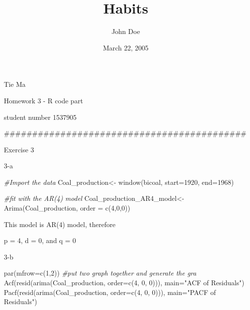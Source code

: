 \documentclass[
]{article}
\title{Habits}
\author{John Doe}
\date{March 22, 2005}
\newenvironment{Shaded}{\begin{snugshade}}{\end{snugshade}}
\newcommand{\AttributeTok}[1]{\textcolor[rgb]{0.77,0.63,0.00}{#1}}
\newcommand{\CommentTok}[1]{\textcolor[rgb]{0.56,0.35,0.01}{\textit{#1}}}
\newcommand{\DecValTok}[1]{\textcolor[rgb]{0.00,0.00,0.81}{#1}}
\newcommand{\FunctionTok}[1]{\textcolor[rgb]{0.00,0.00,0.00}{#1}}
\newcommand{\NormalTok}[1]{#1}
\newcommand{\OtherTok}[1]{\textcolor[rgb]{0.56,0.35,0.01}{#1}}
\newcommand{\StringTok}[1]{\textcolor[rgb]{0.31,0.60,0.02}{#1}}
\begin{document}
\maketitle

Tie Ma

Homework 3 - R code part

student number 1537905

\#\#\#\#\#\#\#\#\#\#\#\#\#\#\#\#\#\#\#\#\#\#\#\#\#\#\#\#\#\#\#\#\#\#\#\#\#\#\#\#\#\#\#

Exercise 3

3-a

\begin{Shaded}
\begin{Highlighting}[]
\CommentTok{\#Import the data}
\NormalTok{Coal\_production}\OtherTok{\textless{}{-}} \FunctionTok{window}\NormalTok{(bicoal, }\AttributeTok{start=}\DecValTok{1920}\NormalTok{, }\AttributeTok{end=}\DecValTok{1968}\NormalTok{)}

\CommentTok{\#fit with the AR(4) model}
\NormalTok{Coal\_production\_AR4\_model}\OtherTok{\textless{}{-}} \FunctionTok{Arima}\NormalTok{(Coal\_production, }\AttributeTok{order =} \FunctionTok{c}\NormalTok{(}\DecValTok{4}\NormalTok{,}\DecValTok{0}\NormalTok{,}\DecValTok{0}\NormalTok{))}
\end{Highlighting}
\end{Shaded}

This model is AR(4) model, therefore

p = 4, d = 0, and q = 0

3-b

\begin{Shaded}
\begin{Highlighting}[]
\FunctionTok{par}\NormalTok{(}\AttributeTok{mfrow=}\FunctionTok{c}\NormalTok{(}\DecValTok{1}\NormalTok{,}\DecValTok{2}\NormalTok{))}
\CommentTok{\#put two graph together and generate the gra}
\FunctionTok{Acf}\NormalTok{(}\FunctionTok{resid}\NormalTok{(}\FunctionTok{arima}\NormalTok{(Coal\_production, }\AttributeTok{order=}\FunctionTok{c}\NormalTok{(}\DecValTok{4}\NormalTok{, }\DecValTok{0}\NormalTok{, }\DecValTok{0}\NormalTok{))), }\AttributeTok{main=}\StringTok{"ACF of Residuals"}\NormalTok{)}
\FunctionTok{Pacf}\NormalTok{(}\FunctionTok{resid}\NormalTok{(}\FunctionTok{arima}\NormalTok{(Coal\_production, }\AttributeTok{order=}\FunctionTok{c}\NormalTok{(}\DecValTok{4}\NormalTok{, }\DecValTok{0}\NormalTok{, }\DecValTok{0}\NormalTok{))), }\AttributeTok{main=}\StringTok{"PACF of Residuals"}\NormalTok{)}
\end{Highlighting}
\end{Shaded}
\end{document}
